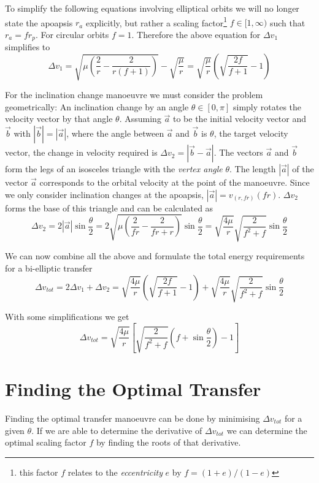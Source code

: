 \documentclass[a4paper, 11pt]{article}
\begin{document}
To simplify the following equations involving elliptical orbits we will no longer state the apoapsis $r_a$ explicitly, but rather a scaling factor\footnote{this factor $f$ relates to the \emph{eccentricity} $e$ by $f=(1+e)/(1-e)$} $f \in [1, \infty)$ such that $r_a = fr_p$. For circular orbits $f=1$. Therefore the above equation for $\Delta{}v_1$ simplifies to
$$\Delta{}v_1
= \sqrt{\mu\left(\frac{2}{r}-\frac{2}{r(f+1)}\right)} - \sqrt{\frac{\mu}{r}}
= \sqrt{\frac{\mu}r}\left(   \sqrt{\frac{2f}{f+1}} - 1  \right)
$$

For the inclination change manoeuvre we must consider the problem geometrically: An inclination change by an angle $\theta \in [0,\pi]$ simply rotates the velocity vector by that angle $\theta$. Assuming $\vec{a}$ to be the initial velocity vector and $\vec{b}$ with $|\vec{b}| = |\vec{a}|$, where the angle between $\vec{a}$ and $\vec{b}$ is $\theta$, the target velocity vector, the change in velocity required is $\Delta{}v_2 = |\vec{b} - \vec{a}|$. The vectors $\vec{a}$ and $\vec{b}$ form the legs of an isosceles triangle with the \emph{vertex angle} $\theta$.
The length $|\vec{a}|$ of the vector $\vec{a}$ corresponds to the orbital velocity at the point of the manoeuvre. Since we only consider inclination changes at the apoapsis, $|\vec{a}| = v_{(r,fr)}(fr)$. $\Delta{}v_2$ forms the base of this triangle and can be calculated as
$$\Delta{}v_2
= 2|\vec{a}|\sin\frac{\theta}2
= 2\sqrt{  \mu \left(  \frac{2}{fr} - \frac{2}{fr + r}  \right) } \sin\frac{\theta}2
= \sqrt{\frac{4\mu}r} \sqrt{\frac{2}{f^2+f}} \sin\frac{\theta}2
$$

We can now combine all the above and formulate the total energy requirements for a bi-elliptic transfer
$$\Delta{}v_{tot}
= 2\Delta{}v_1 + \Delta{}v_2
= \sqrt{\frac{4\mu}r}\left( \sqrt{\frac{2f}{f+1}} - 1  \right) + \sqrt{\frac{4\mu}r} \sqrt{\frac{2}{f^2+f}} \sin\frac{\theta}2$$

With some simplifications we get
$$\Delta{}v_{tot}= \sqrt{\frac{4\mu}r}\left[ \sqrt{\frac{2}{f^2 + f}} \left(f + \sin\frac{\theta}2 \right) - 1  \right]$$

\section{Finding the Optimal Transfer}
Finding the optimal transfer manoeuvre can be done by minimising $\Delta{}v_{tot}$ for a given $\theta$. If we are able to determine the derivative of $\Delta v_{tot}$ we can determine the optimal scaling factor $f$ by finding the roots of that derivative.
\end{document}
